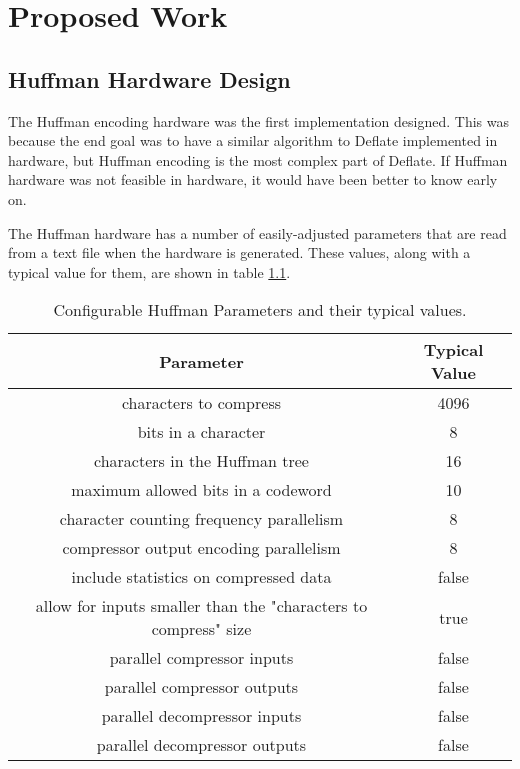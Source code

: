 \documentclass[doublespace,draft,nopageskip]{VTthesis} %
\begin{document}

\chapter{Proposed Work} \label{ch:proposed_work}
\section{Huffman Hardware Design}\label{se:huffman_hardware_design}
The Huffman encoding hardware was the first implementation designed. This was because the end goal was to have a similar algorithm to Deflate implemented in hardware, but Huffman encoding is the most complex part of Deflate. If Huffman hardware was not feasible in hardware, it would have been better to know early on.

The Huffman hardware has a number of easily-adjusted parameters that are read from a text file when the hardware is generated. These values, along with a typical value for them, are shown in table \ref{tab:huffman-configuration-table}.

\begin{table}[htb]
	\centering
	\caption{Configurable Huffman Parameters and their typical values.}
	\begin{tabular}{|c|c|}
	    \hline
	    Parameter & Typical Value \\
	    \hline
	    characters to compress & 4096 \\
	    \hline
	    bits in a character & 8 \\
	    \hline
	    characters in the Huffman tree & 16 \\
	    \hline
	    maximum allowed bits in a codeword & 10 \\
	    \hline
	    character counting frequency parallelism & 8 \\
	    \hline
	    compressor output encoding parallelism & 8 \\
	    \hline
	    include statistics on compressed data & false \\
	    \hline
	    allow for inputs smaller than the "characters to compress" size & true \\
	    \hline
	    parallel compressor inputs & false \\
	    \hline
	    parallel compressor outputs & false \\
	    \hline
	    parallel decompressor inputs & false \\ 
	    \hline
	    parallel decompressor outputs & false \\
	    \hline
	\end{tabular}
	\label{tab:huffman-configuration-table}
\end{table}
\end{document}
